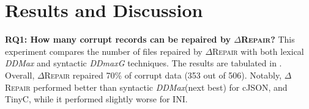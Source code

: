 \documentclass[acmsmall,screen,review,anonymous]{acmart}
\newcommand{\formatfree}{format-free\xspace}
\newcommand{\formatdependent}{format-dependent\xspace}
\newcommand{\dtask}{data repair\xspace}
\newcommand{\approach}{\textsc{$\Delta$Repair}\xspace}
\newcommand{\ddmax}{\textit{DDMax}\xspace}
\newcommand{\ddmaxg}{\textit{DDmaxG}\xspace}
\newcommand{\drepair}{\approach}
\begin{document}
% 
% 
% 

\section{Results and Discussion}
\label{sec:discussion}
\noindent\textbf{RQ1: How many corrupt records can be repaired by \drepair?}
This experiment compares the number of files repaired by \drepair with both
lexical \ddmax and syntactic \ddmaxg techniques.
The results are tabulated in .
Overall, \drepair repaired 70\% of corrupt data (353 out of 506). %
Notably, \drepair performed better than syntactic \ddmax (next best)
for cJSON, and TinyC, while it performed slightly worse for INI.
\end{document}
